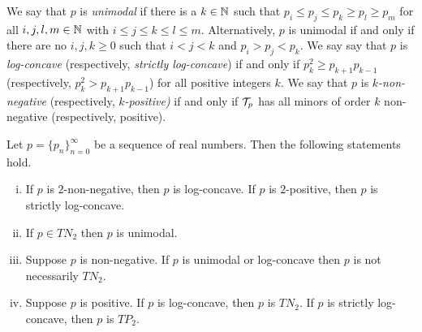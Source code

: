 \documentclass[12pt]{article}
\begin{document}
We say that $p$ is \emph{unimodal} if there is a $k \in \mathbb{N}$ such that $p_i \leq p_j \leq p_k \geq p_l \geq p_m$ for all $i,j,l,m \in \mathbb{N}$ with $i\leq j \leq k \leq l \leq m$.  Alternatively, $p$ is unimodal if and only if there are no $i, j, k \geq 0$ such that $i < j < k$ and $p_i > p_j< p_k$.  We say say that $p$ is \emph{log-concave} (respectively, \emph{strictly log-concave}) if and only if $p_k^2  \geq p_{k+1}p_{k-1}$ (respectively, $p_k^2 > p_{k+1}p_{k-1}$) for all positive integers $k$.  We say that $p$ is \emph{$k$-non-negative} (respectively, \emph{$k$-positive)} if and only if ${\cal T}_p$ has all minors of order $k$ non-negative (respectively, positive).


\begin{lemma} \label{L:basic} Let $p = \{p_n\}_{n=0}^\infty$ be a sequence of real numbers.  Then the following statements hold.

\begin{enumerate}[(i)]


\item If $p$ is $2$-non-negative, then $p$ is log-concave. If $p$ is $2$-positive, then $p$ is strictly log-concave.


\item If $p \in TN_2$ then $p$ is unimodal.

\item Suppose $p$ is non-negative.  If $p$ is unimodal or log-concave then $p$ is not necessarily $TN_2$.

\item Suppose $p$ is positive.  If $p$ is log-concave, then $p$ is $TN_2$.  If $p$ is strictly log-concave, then $p$ is $TP_2$.


 
\end{enumerate}

\end{lemma}
\end{document}

